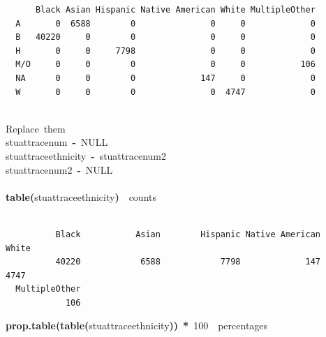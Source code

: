 \documentclass[12pt]{article}
\makeatletter
\newcommand{\hlnumber}[1]{\textcolor[rgb]{0,0,0}{#1}}%
\newcommand{\hlfunctioncall}[1]{\textcolor[rgb]{0.501960784313725,0,0.329411764705882}{\textbf{#1}}}%
\newcommand{\hlkeyword}[1]{\textcolor[rgb]{0,0,0}{\textbf{#1}}}%
\newcommand{\hlcomment}[1]{\textcolor[rgb]{0.180392156862745,0.6,0.341176470588235}{#1}}%
\newcommand{\hlassignement}[1]{\textcolor[rgb]{0,0,0}{\textbf{#1}}}%
\newcommand{\hlsymbol}[1]{\textcolor[rgb]{0,0,0}{#1}}%
\newcommand{\hlstd}[1]{\textcolor[rgb]{0,0,0}{#1}}%
\newenvironment{kframe}{%
 \def\FrameCommand##1{\hskip\@totalleftmargin \hskip-\fboxsep
 \colorbox{shadecolor}{##1}\hskip-\fboxsep
     \hskip-\linewidth \hskip-\@totalleftmargin \hskip\columnwidth}%
 \MakeFramed {\advance\hsize-\width
   \@totalleftmargin\z@ \linewidth\hsize
   \@setminipage}}%
 {\par\unskip\endMakeFramed}
\newenvironment{knitrout}{}{} %
\renewenvironment{knitrout}{\begin{footnotesize}}{\end{footnotesize}}
\makeatother
\begin{document}
\begin{knitrout}
\begin{kframe}
\begin{verbatim}
      Black Asian Hispanic Native American White MultipleOther
  A       0  6588        0               0     0             0
  B   40220     0        0               0     0             0
  H       0     0     7798               0     0             0
  M/O     0     0        0               0     0           106
  NA      0     0        0             147     0             0
  W       0     0        0               0  4747             0
\end{verbatim}
\begin{flushleft}
\ttfamily\noindent
\hspace*{\fill}\\
\hlstd{}\hlcomment{\usebox{\hlnormalsizeboxhash}{\ }Replace{\ }them}\hspace*{\fill}\\
\hlstd{}\hlsymbol{stuatt}\hlkeyword{\usebox{\hlnormalsizeboxdollar}}\hlsymbol{race\usebox{\hlnormalsizeboxunderscore}num}{\ }\hlassignement{\usebox{\hlnormalsizeboxlessthan}-}{\ }NULL\hspace*{\fill}\\
\hlstd{}\hlsymbol{stuatt}\hlkeyword{\usebox{\hlnormalsizeboxdollar}}\hlsymbol{race\usebox{\hlnormalsizeboxunderscore}ethnicity}{\ }\hlassignement{\usebox{\hlnormalsizeboxlessthan}-}{\ }\hlsymbol{stuatt}\hlkeyword{\usebox{\hlnormalsizeboxdollar}}\hlsymbol{race\usebox{\hlnormalsizeboxunderscore}num2}\hspace*{\fill}\\
\hlstd{}\hlsymbol{stuatt}\hlkeyword{\usebox{\hlnormalsizeboxdollar}}\hlsymbol{race\usebox{\hlnormalsizeboxunderscore}num2}{\ }\hlassignement{\usebox{\hlnormalsizeboxlessthan}-}{\ }NULL\hspace*{\fill}\\
\hlstd{}\hspace*{\fill}\\
\hlstd{}\hlfunctioncall{table}\hlkeyword{(}\hlsymbol{stuatt}\hlkeyword{\usebox{\hlnormalsizeboxdollar}}\hlsymbol{race\usebox{\hlnormalsizeboxunderscore}ethnicity}\hlkeyword{)}{\ }{\ }\hlcomment{\usebox{\hlnormalsizeboxhash}{\ }counts}\mbox{}
\normalfont
\end{flushleft}
\begin{verbatim}

          Black           Asian        Hispanic Native American           White 
          40220            6588            7798             147            4747 
  MultipleOther 
            106 
\end{verbatim}
\begin{flushleft}
\ttfamily\noindent
\hlfunctioncall{prop.table}\hlkeyword{(}\hlfunctioncall{table}\hlkeyword{(}\hlsymbol{stuatt}\hlkeyword{\usebox{\hlnormalsizeboxdollar}}\hlsymbol{race\usebox{\hlnormalsizeboxunderscore}ethnicity}\hlkeyword{)}\hlkeyword{)}{\ }\hlkeyword{*}{\ }\hlnumber{100}{\ }{\ }\hlcomment{\usebox{\hlnormalsizeboxhash}percentages}\mbox{}
\normalfont
\end{flushleft}
\begin{verbatim}


\end{verbatim}
\end{kframe}
\end{knitrout}
\end{document}
